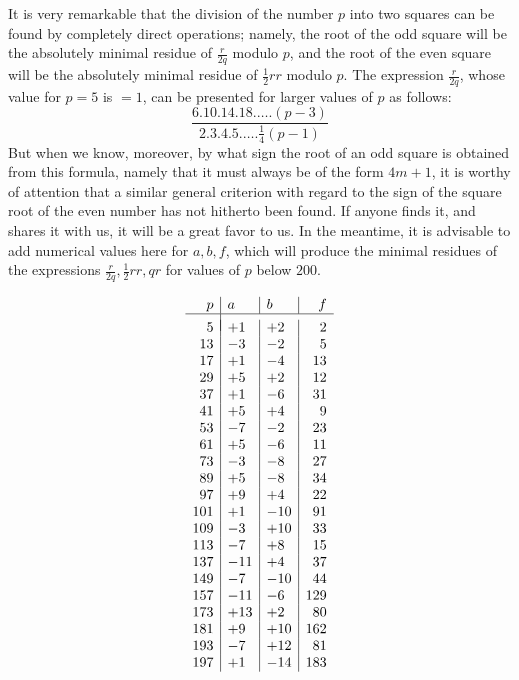 \documentclass{book}
\theoremstyle{plain}
\theoremstyle{remark}
\begin{document}
 It is very remarkable that the division of the number $p$ into two squares can be found by completely direct operations; namely, the root of the odd square will be the absolutely minimal residue of $\frac{r}{2q}$ modulo $p$, and the root of the even square will be the absolutely minimal residue of $\tfrac{1}{2}rr$ modulo $p$.  The expression $\frac{r}{2q}$, whose value for $p=5$ is $=1$, can be presented for larger values of $p$ as follows:
 \[ \frac{6.10.14.18.\dots.(p-3)}{2.3.4.5.\dots.\frac{1}{4}(p-1)} \]
But when we know, moreover, by what sign the root of an odd square is obtained from this formula, namely that it must always be of the form $4m+1$, it is worthy of attention that a similar general criterion with regard to the sign of the square root of the even number has not hitherto been found.  If anyone finds it, and shares it with us, it will be a great favor to us.   In the meantime, it is advisable to add numerical values here for $a,b,f$, which will produce the minimal residues of the expressions $\frac{r}{2q}, \frac{1}{2} rr, qr$  for values of $p$ below $200$.

\[
\begin{array}{r|l|l|r}
p & a & b & f \\
\hline \\[-8pt]
5 & + 1 & + 2 & 2 \\
13 & - 3 & - 2 & 5 \\
17 & + 1 & - 4 & 13 \\
29& + 5 & + 2 & 12 \\
37& + 1 & - 6 & 31 \\
41& + 5 & + 4 & 9 \\
53 & - 7 & - 2 & 23 \\
61& + 5 & - 6 & 11 \\
73& - 3 & - 8 & 27 \\
89& + 5 & - 8 & 34 \\
97& + 9 & + 4 & 22 \\
101& + 1 & - 10 & 91 \\
109& - 3 & + 10 & 33 \\
113& - 7 & + 8 & 15 \\
137& - 11 & + 4 & 37 \\
149&  - 7& - 10 & 44 \\
157&  - 11 & - 6 & 129 \\
173& + 13 & + 2 & 80 \\
181& + 9 & + 10 & 162 \\
193& - 7 & + 12 & 81 \\
197& + 1 & - 14 & 183 
\end{array} \]
 
\end{document}
